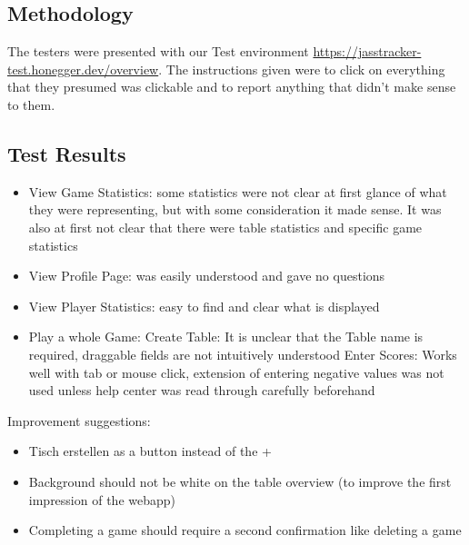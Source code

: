 \subsection{Methodology}
The testers were presented with our Test environment \url{https://jasstracker-test.honegger.dev/overview}.
The instructions given were to click on everything that they presumed was clickable and to report anything that didn't make sense to them. 

\subsection{Test Results}
\begin{itemize}
    \item View Game Statistics: some statistics were not clear at first glance of what they were representing, but with some consideration it made sense. It was also at first not clear that there were table statistics and specific game statistics
    \item View Profile Page: was easily understood and gave no questions
    \item View Player Statistics: easy to find and clear what is displayed 
    \item Play a whole Game:
    \subitem Create Table: It is unclear that the Table name is required, draggable fields are not intuitively understood
    \subitem Enter Scores: Works well with tab or mouse click, extension of entering negative values was not used unless help center was read through carefully beforehand
\end{itemize}
Improvement suggestions: 
\begin{itemize}
    \item Tisch erstellen as a button instead of the +
    \item Background should not be white on the table overview (to improve the first impression of the webapp)
    \item Completing a game should require a second confirmation like deleting a game
\end{itemize}

